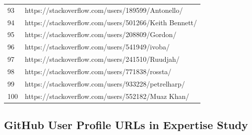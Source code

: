 \begin{center}
\begin{longtable}{|p{1.5cm}|p{12.5cm}|}
            93 & https://stackoverflow.com/users/189599/Antonello/ \\
            94 & https://stackoverflow.com/users/501266/Keith Bennett/ \\
            95 & https://stackoverflow.com/users/208809/Gordon/ \\
            96 & https://stackoverflow.com/users/541949/ivoba/ \\
            97 & https://stackoverflow.com/users/241510/Ruudjah/ \\
            98 & https://stackoverflow.com/users/771838/rossta/ \\
            99 & https://stackoverflow.com/users/933228/petrelharp/ \\
            100 & https://stackoverflow.com/users/552182/Muaz Khan/ \\
            \hline
            \end{longtable}
            \end{center}
        
        \subsection{GitHub User Profile URLs in Expertise Study}
        
